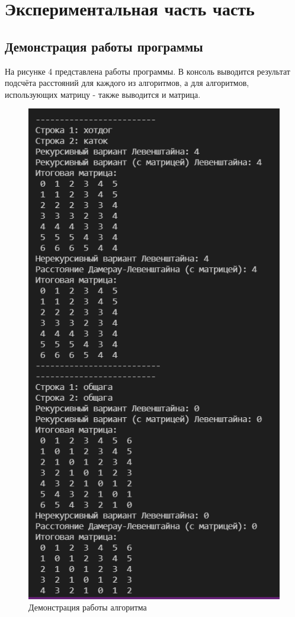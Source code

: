\chapter{Экспериментальная часть часть}

\section{Демонстрация работы программы}
На рисунке 4 представлена работы программы. В консоль выводится результат подсчёта расстояний для каждого из алгоритмов, а для алгоритмов, использующих матрицу - также выводится и матрица.

\begin{figure}[hp]
    \begin{center}
        \includegraphics[scale = 0.8]{inc/demonstrate.PNG}
    \end{center}
    \caption{Демонстрация работы алгоритма}
\end{figure}
\clearpage

